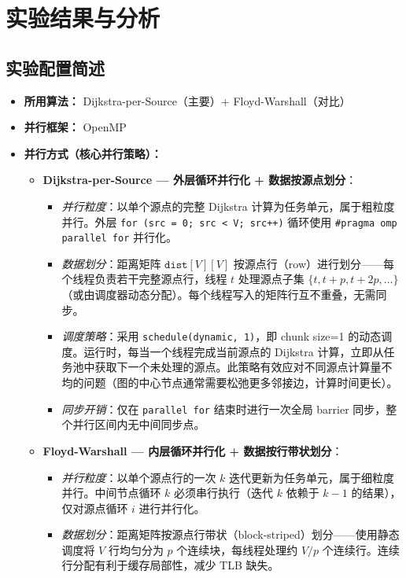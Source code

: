 \documentclass{SYSUReport}
\begin{document}
\section{实验结果与分析}

\subsection{实验配置简述}
\begin{itemize}
    \item \textbf{所用算法：} Dijkstra-per-Source（主要）+ Floyd-Warshall（对比）
    \item \textbf{并行框架：} OpenMP
    \item \textbf{并行方式（核心并行策略）：}
        \begin{itemize}
            \item \textbf{Dijkstra-per-Source — 外层循环并行化 + 数据按源点划分}：
            \begin{itemize}
                \item \textit{并行粒度}：以单个源点的完整 Dijkstra 计算为任务单元，属于粗粒度并行。外层 \texttt{for (src = 0; src < V; src++)} 循环使用 \texttt{\#pragma omp parallel for} 并行化。
                \item \textit{数据划分}：距离矩阵 $\texttt{dist}[V][V]$ 按源点行（row）进行划分——每个线程负责若干完整源点行，线程 $t$ 处理源点子集 $\{t, t+p, t+2p, \dots\}$（或由调度器动态分配）。每个线程写入的矩阵行互不重叠，无需同步。
                \item \textit{调度策略}：采用 \texttt{schedule(dynamic, 1)}，即 chunk size=1 的动态调度。运行时，每当一个线程完成当前源点的 Dijkstra 计算，立即从任务池中获取下一个未处理的源点。此策略有效应对不同源点计算量不均的问题（图的中心节点通常需要松弛更多邻接边，计算时间更长）。
                \item \textit{同步开销}：仅在 \texttt{parallel for} 结束时进行一次全局 barrier 同步，整个并行区间内无中间同步点。
            \end{itemize}
            \item \textbf{Floyd-Warshall — 内层循环并行化 + 数据按行带状划分}：
            \begin{itemize}
                \item \textit{并行粒度}：以单个源点行的一次 $k$ 迭代更新为任务单元，属于细粒度并行。中间节点循环 $k$ 必须串行执行（迭代 $k$ 依赖于 $k-1$ 的结果），仅对源点循环 $i$ 进行并行化。
                \item \textit{数据划分}：距离矩阵按源点行带状（block-striped）划分——使用静态调度将 $V$ 行均匀分为 $p$ 个连续块，每线程处理约 $V/p$ 个连续行。连续行分配有利于缓存局部性，减少 TLB 缺失。

\end{itemize}
\end{itemize}
\end{itemize}
\end{document}

